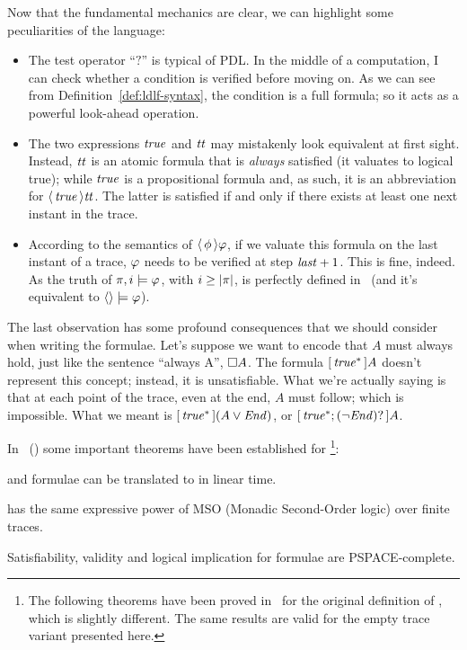 Now that the fundamental mechanics are clear, we can highlight some
peculiarities of the language:
\begin{itemize}
	\item The test operator ``$?$'' is typical of PDL. In the middle of a
		\re{} computation, I can check whether a condition is verified before
		moving on. As we can see from Definition~\ref{def:ldlf-syntax}, the
		condition is a full \ldl{} formula; so it acts as a powerful look-ahead
		operation.
	\item The two expressions $\text{\textit{true}}$ and $\text{\textit{tt}}$ may mistakenly look equivalent
		at first sight. Instead, $\text{\textit{tt}}$ is an atomic formula that is \emph{always}
		satisfied (it valuates to logical true); while $\text{\textit{true}}$ is a propositional
		formula and, as such, it is an abbreviation for $\langle\, {\text{\textit{true}}} \,\rangle\text{\textit{tt}}$.
		The latter is satisfied if and only if there exists at least one next
		instant in the trace.
	\item According to the semantics of $\langle\, {\phi} \,\rangle\varphi$, if we
		valuate this formula on the last instant of a trace, $\varphi$ needs to
		be verified at step $\text{\textit{last}}+1$. This is fine, indeed. As the truth
		of $\pi, i \models \varphi$, with $i \ge \lvert\pi\rvert$, is perfectly
		defined in~\ldl{} (and it's equivalent to $\langle \rangle \models
		\varphi$).
\end{itemize}

The last observation has some profound consequences that we should consider
when writing the formulae. Let's suppose we want to encode that $A$ must
always hold, just like the \ltl{} sentence ``always A'', $\square A$. The
\ldl{} formula ${[\, {\text{\textit{true}}^*} \,]A}$ doesn't represent this concept; instead, it
is unsatisfiable. What we're actually saying is that at each point of
the trace, even at the end, $A$ must follow; which is impossible. What we
meant is ${[\, {\text{\textit{true}}^*} \,](A \lor \text{\textit{End}})}$, or ${[\, {\text{\textit{true}}^*; (\neg
\text{\textit{End}})?} \,]A}$.

In~\cite{bib:ltlf-ldlf} (\citeauthor{bib:ltlf-ldlf}) some important theorems
have been established for \ldl{}\footnote{
	The following theorems have been proved in~\cite{bib:ltlf-ldlf} for the
	original definition of \ldl{}, which is slightly different. The same results
	are valid for the empty trace variant presented here.
}:
\begin{theorem}
	\ltl{} and \re{} formulae can be translated to \ldl{} in linear time.
\end{theorem}
\begin{theorem}
	\ldl{} has the same expressive power of MSO (Monadic Second-Order logic)
	over finite traces.
\end{theorem}
\begin{theorem}
	Satisfiability, validity and logical implication for \ldl{} formulae are
	PSPACE-complete.
	\label{th:ldlf-completeness}
\end{theorem}


